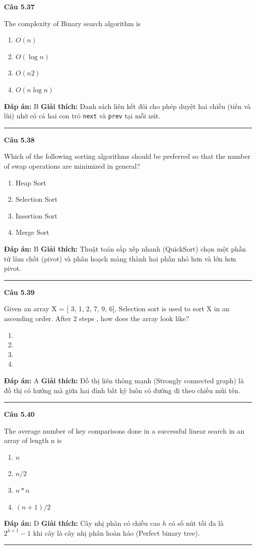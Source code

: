 \documentclass[11pt,a4paper]{article}
\newenvironment{question}[1]{%
  \par\vspace{1em}\noindent\textbf{\large Câu #1}\par\vspace{0.4em}
}{%
  \par\vspace{1em}\hrule\vspace{0.6em}
}
\newenvironment{choices}{%
  \begin{enumerate}[label=\textbf{\Alph*.},leftmargin=2.2em,itemsep=2pt,topsep=3pt]
}{%
  \end{enumerate}
}
\newcommand{\choice}{\item}
\begin{document}
\begin{question}{5.37}
The complexity of Binary search algorithm is
\begin{choices}
\choice $O(n)$
\choice $O(\log n)$
\choice $O(n2)$
\choice $O(n\log n)$
\end{choices}
\textbf{Đáp án:} B
\textbf{Giải thích:} Danh sách liên kết đôi cho phép duyệt hai chiều (tiến và lùi) nhờ có cả hai con trỏ \texttt{next} và \texttt{prev} tại mỗi nút.
\end{question}

\begin{question}{5.38}
Which of the following sorting algorithms should be preferred so that the number of swap operations are minimized in general?
\begin{choices}
\choice Heap Sort
\choice Selection Sort
\choice Insertion Sort
\choice Merge Sort
\end{choices}
\textbf{Đáp án:} B
\textbf{Giải thích:} Thuật toán sắp xếp nhanh (QuickSort) chọn một phần tử làm chốt (pivot) và phân hoạch mảng thành hai phần nhỏ hơn và lớn hơn pivot.
\end{question}

\begin{question}{5.39}
Given an array X = [ 3, 1, 2, 7, 9, 6], Selection sort is used to sort X in an ascending order. After 2 steps , how does the array look like?
\begin{choices}
\choice [1, 2, 3, 7, 9, 6]
\choice [3, 1, 2, 7, 9, 6]
\choice [1, 3, 2, 7, 9, 6]
\choice [1, 2, 3, 6, 7, 9]
\end{choices}
\textbf{Đáp án:} A
\textbf{Giải thích:} Đồ thị liên thông mạnh (Strongly connected graph) là đồ thị có hướng mà giữa hai đỉnh bất kỳ luôn có đường đi theo chiều mũi tên.
\end{question}

\begin{question}{5.40}
The average number of key comparisons done in a successful linear search in an array of length n is
\begin{choices}
\choice $n$
\choice $n/2$
\choice $n * n$
\choice $(n + 1)/2$
\end{choices}
\textbf{Đáp án:} D
\textbf{Giải thích:} Cây nhị phân có chiều cao $h$ có số nút tối đa là $2^{h+1} - 1$ khi cây là cây nhị phân hoàn hảo (Perfect binary tree).
\end{question}
\end{document}
